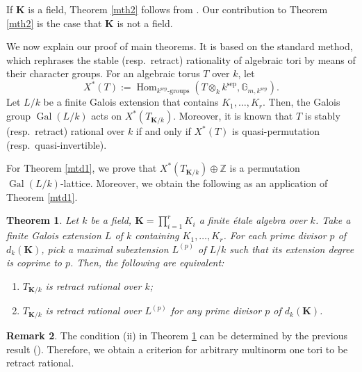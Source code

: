 \documentclass[12pt]{amsart}
\theoremstyle{plain}
\newtheorem{thm}{Theorem}[section]
\theoremstyle{definition}
\newtheorem{rem}[thm]{Remark}
\numberwithin{thm}{section}
\numberwithin{equation}{section}
\newcommand{\Z}{\mathbb{Z}}
\newcommand{\G}{\mathbb{G}}
\newcommand{\bK}{\mathbf{K}}
\DeclareMathOperator{\Hom}{Hom}
\DeclareMathOperator{\Gal}{Gal}
\DeclareMathOperator{\sep}{sep}
\begin{document}
If $\bK$ is a field, Theorem \ref{mth2} follows from \cite[Theorem 1.1]{Hoshi2024}. Our contribution to Theorem \ref{mth2} is the case that $\bK$ is not a field. 

\vspace{6pt}

We now explain our proof of main theorems. It is based on the standard method, which rephrases the stable (resp.~retract) rationality of algebraic tori by means of their character groups. For an algebraic torus $T$ over $k$, let
\begin{equation*}
    X^{*}(T):=\Hom_{k^{\sep}\text{-groups}}(T\otimes_{k}k^{\sep},\G_{m,k^{\sep}}). 
\end{equation*}
Let $L/k$ be a finite Galois extension that contains $K_{1},\ldots,K_{r}$. Then, the Galois group $\Gal(L/k)$ acts on $X^{*}(T_{\bK/k})$. Moreover, it is known that $T$ is stably (resp.~retract) rational over $k$ if and only if $X^{*}(T)$ is quasi-permutation (resp.~quasi-invertible). 

For Theorem \ref{mtd1}, we prove that $X^{*}(T_{\bK/k})\oplus \Z$ is a permutation $\Gal(L/k)$-lattice. Moreover, we obtain the following as an application of Theorem \ref{mtd1}. %

\begin{thm}\label{mth3}
Let $k$ be a field, $\bK=\prod_{i=1}^{r}K_{i}$ a finite {\'e}tale algebra over $k$. Take a finite Galois extension $L$ of $k$ containing $K_{1},\ldots,K_{r}$. For each prime divisor $p$ of $d_{k}(\bK)$, pick a maximal subextension $L^{(p)}$ of $L/k$ such that its extension degree is coprime to $p$. Then, the following are equivalent: 
\begin{enumerate}
    \item $T_{\bK/k}$ is retract rational over $k$; 
    \item $T_{\bK/k}$ is retract rational over $L^{(p)}$ for any prime divisor $p$ of $d_{k}(\bK)$. 
\end{enumerate}
\end{thm}

\begin{rem}\label{rem:rdct}
The condition (ii) in Theorem \ref{mth3} can be determined by the previous result (\cite[Theorems 1.2, 1.3]{Hasegawa}). Therefore, we obtain a criterion for arbitrary multinorm one tori to be retract rational.
\end{rem}
\end{document}
